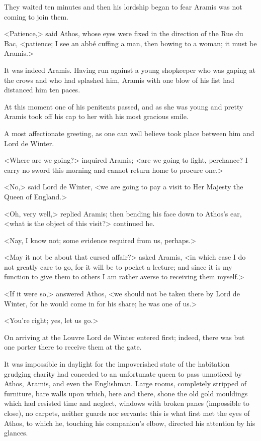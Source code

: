 They waited ten minutes and then his lordship began to fear Aramis was not coming to join them.

<Patience,> said Athos, whose eyes were fixed in the direction of the Rue du Bac, <patience; I see an abbé cuffing a man, then bowing to a woman; it must be Aramis.>

It was indeed Aramis. Having run against a young shopkeeper who was gaping at the crows and who had splashed him, Aramis with one blow of his fist had distanced him ten paces.

At this moment one of his penitents passed, and as she was young and pretty Aramis took off his cap to her with his most gracious smile.

A most affectionate greeting, as one can well believe took place between him and Lord de Winter.

<Where are we going?> inquired Aramis; <are we going to fight, perchance? I carry no sword this morning and cannot return home to procure one.>

<No,> said Lord de Winter, <we are going to pay a visit to Her Majesty the Queen of England.>

<Oh, very well,> replied Aramis; then bending his face down to Athos's ear, <what is the object of this visit?> continued he.

<Nay, I know not; some evidence required from us, perhaps.>

<May it not be about that cursed affair?> asked Aramis, <in which case I do not greatly care to go, for it will be to pocket a lecture; and since it is my function to give them to others I am rather averse to receiving them myself.>

<If it were so,> answered Athos, <we should not be taken there by Lord de Winter, for he would come in for his share; he was one of us.>

<You're right; yes, let us go.>

On arriving at the Louvre Lord de Winter entered first; indeed, there was but one porter there to receive them at the gate.

It was impossible in daylight for the impoverished state of the habitation grudging charity had conceded to an unfortunate queen to pass unnoticed by Athos, Aramis, and even the Englishman. Large rooms, completely stripped of furniture, bare walls upon which, here and there, shone the old gold mouldings which had resisted time and neglect, windows with broken panes (impossible to close), no carpets, neither guards nor servants: this is what first met the eyes of Athos, to which he, touching his companion's elbow, directed his attention by his glances.

